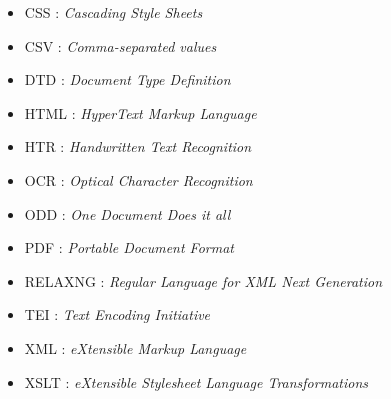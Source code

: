 \begin{itemize}
    
    \item CSS : \emph{Cascading Style Sheets}
    \item CSV : \emph{Comma-separated values}
    \item DTD : \emph{Document Type Definition}
    \item HTML : \emph{HyperText Markup Language}
    \item HTR : \emph{Handwritten Text Recognition}
    \item OCR : \emph{Optical Character Recognition}
    \item ODD : \emph{One Document Does it all}
    \item PDF : \emph{Portable Document Format}
    \item RELAXNG : \emph{Regular Language for XML Next Generation}
    \item TEI : \emph{Text Encoding Initiative}
    \item XML : \emph{eXtensible Markup Language}
    \item XSLT : \emph{eXtensible Stylesheet Language Transformations}
\end{itemize}
